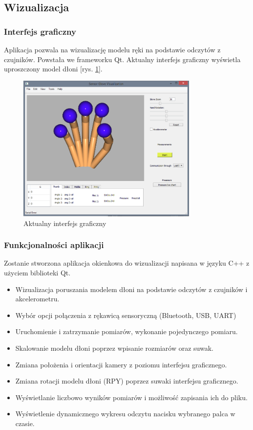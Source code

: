 \documentclass[12pt,a4paper]{article}
\begin{document}
\subsection{Wizualizacja}
\subsubsection{Interfejs graficzny}
Aplikacja pozwala na wizualizację modelu ręki na podstawie odczytów z czujników. Powstała we frameworku Qt. Aktualny interfejs graficzny wyświetla uproszczony model dłoni [rys. \ref{fig:wds}].

\begin{figure}[!htb]
\centering
\includegraphics[width=0.8\textwidth]{images/aktualnyinterfejsgraficzny.png}
\caption{Aktualny interfejs graficzny}
\label{fig:wds}
\end{figure}

\subsubsection{Funkcjonalności aplikacji}
Zostanie stworzona aplikacja okienkowa do wizualizacji napisana w języku C++ z użyciem biblioteki Qt.\\
\begin{itemize}
\item Wizualizacja poruszania modelem dłoni na podstawie odczytów z czujników i akcelerometru.
\item Wybór opcji połączenia z rękawicą sensoryczną (Bluetooth, USB, UART)
\item Uruchomienie i zatrzymanie pomiarów, wykonanie pojedynczego pomiaru.
\item Skalowanie modelu dłoni poprzez wpisanie rozmiarów oraz suwak.
\item Zmiana położenia i orientacji kamery z poziomu interfejsu graficznego.
\item Zmiana rotacji modelu dłoni (RPY) poprzez suwaki interfejsu graficznego.
\item Wyświetlanie liczbowo wyników pomiarów i możliwość zapisania ich do pliku.
\item Wyświetlenie dynamicznego wykresu odczytu nacisku wybranego palca w czasie.
\end{itemize}
\end{document}
